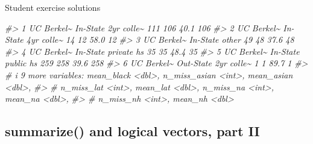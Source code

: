 \documentclass[
  8pt,
  ignorenonframetext,
  dvipsnames]{beamer}
\newenvironment{Shaded}{\begin{snugshade}}{\end{snugshade}}
\newcommand{\CommentTok}[1]{\textcolor[rgb]{0.56,0.35,0.01}{\textit{#1}}}
\begin{document}
\begin{frame}[fragile]{Student exercise solutions}
\begin{Shaded}
\begin{Highlighting}[]
\CommentTok{\#\textgreater{} 1 UC Berkel\textasciitilde{} In{-}State   2yr colle\textasciitilde{}      111          106       40.1          106}
\CommentTok{\#\textgreater{} 2 UC Berkel\textasciitilde{} In{-}State   4yr colle\textasciitilde{}       14           12       58.0           12}
\CommentTok{\#\textgreater{} 3 UC Berkel\textasciitilde{} In{-}State   other            49           48       37.6           48}
\CommentTok{\#\textgreater{} 4 UC Berkel\textasciitilde{} In{-}State   private hs       35           35       48.4           35}
\CommentTok{\#\textgreater{} 5 UC Berkel\textasciitilde{} In{-}State   public hs       259          258       39.6          258}
\CommentTok{\#\textgreater{} 6 UC Berkel\textasciitilde{} Out{-}State  2yr colle\textasciitilde{}        1            1       89.7            1}
\CommentTok{\#\textgreater{} \# i 9 more variables: mean\_black \textless{}dbl\textgreater{}, n\_miss\_asian \textless{}int\textgreater{}, mean\_asian \textless{}dbl\textgreater{},}
\CommentTok{\#\textgreater{} \#   n\_miss\_lat \textless{}int\textgreater{}, mean\_lat \textless{}dbl\textgreater{}, n\_miss\_na \textless{}int\textgreater{}, mean\_na \textless{}dbl\textgreater{},}
\CommentTok{\#\textgreater{} \#   n\_miss\_nh \textless{}int\textgreater{}, mean\_nh \textless{}dbl\textgreater{}}
\end{Highlighting}
\end{Shaded}
\end{frame}

\hypertarget{summarize-and-logical-vectors-part-ii}{%
\subsection{summarize() and logical vectors, part
II}\label{summarize-and-logical-vectors-part-ii}}
\end{document}

